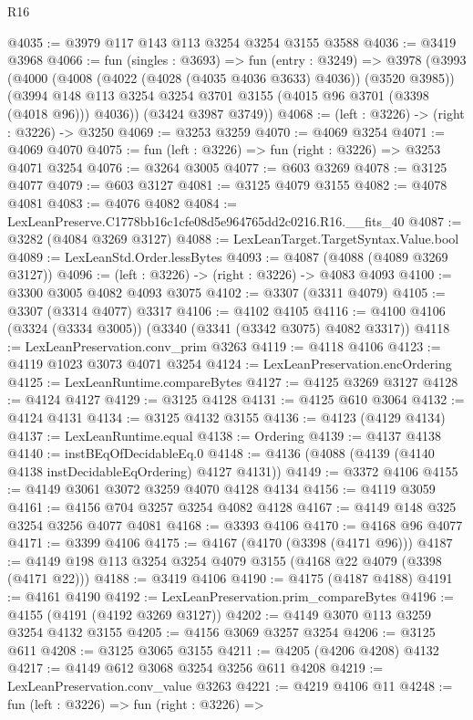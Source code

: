 \begin{lexlean}{R16}
\begin{coremodule}
@4035 := @3979 @117 @143 @113 @3254 @3254 @3155 @3588
@4036 := @3419 @3968
@4066 := fun (singles : @3693) =>
  fun (entry : @3249) =>
  @3978
    (@3993
      (@4000
        (@4008 (@4022 (@4028 (@4035 @4036 @3633) @4036)) (@3520 @3985))
        (@3994 @148 @113 @3254 @3254 @3701 @3155 (@4015 @96 @3701 (@3398 (@4018 @96))) @4036))
      (@3424 @3987 @3749))
@4068 := (left : @3226) -> (right : @3226) -> @3250
@4069 := @3253 @3259
@4070 := @4069 @3254
@4071 := @4069 @4070
@4075 := fun (left : @3226) => fun (right : @3226) => @3253 @4071 @3254
@4076 := @3264 @3005
@4077 := @603 @3269
@4078 := @3125 @4077
@4079 := @603 @3127
@4081 := @3125 @4079 @3155
@4082 := @4078 @4081
@4083 := @4076 @4082
@4084 := LexLeanPreserve.C1778bb16c1cfe08d5e964765dd2c0216.R16.__fits_40
@4087 := @3282 (@4084 @3269 @3127)
@4088 := LexLeanTarget.TargetSyntax.Value.bool
@4089 := LexLeanStd.Order.lessBytes
@4093 := @4087 (@4088 (@4089 @3269 @3127))
@4096 := (left : @3226) -> (right : @3226) -> @4083 @4093
@4100 := @3300 @3005 @4082 @4093 @3075
@4102 := @3307 (@3311 @4079)
@4105 := @3307 (@3314 @4077) @3317
@4106 := @4102 @4105
@4116 := @4100 @4106 (@3324 (@3334 @3005)) (@3340 (@3341 (@3342 @3075) @4082 @3317))
@4118 := LexLeanPreservation.conv_prim @3263
@4119 := @4118 @4106
@4123 := @4119 @1023 @3073 @4071 @3254
@4124 := LexLeanPreservation.encOrdering
@4125 := LexLeanRuntime.compareBytes
@4127 := @4125 @3269 @3127
@4128 := @4124 @4127
@4129 := @3125 @4128
@4131 := @4125 @610 @3064
@4132 := @4124 @4131
@4134 := @3125 @4132 @3155
@4136 := @4123 (@4129 @4134)
@4137 := LexLeanRuntime.equal
@4138 := Ordering
@4139 := @4137 @4138
@4140 := instBEqOfDecidableEq.{0}
@4148 := @4136 (@4088 (@4139 (@4140 @4138 instDecidableEqOrdering) @4127 @4131))
@4149 := @3372 @4106
@4155 := @4149 @3061 @3072 @3259 @4070 @4128 @4134
@4156 := @4119 @3059
@4161 := @4156 @704 @3257 @3254 @4082 @4128
@4167 := @4149 @148 @325 @3254 @3256 @4077 @4081
@4168 := @3393 @4106
@4170 := @4168 @96 @4077
@4171 := @3399 @4106
@4175 := @4167 (@4170 (@3398 (@4171 @96)))
@4187 := @4149 @198 @113 @3254 @3254 @4079 @3155 (@4168 @22 @4079 (@3398 (@4171 @22)))
@4188 := @3419 @4106
@4190 := @4175 (@4187 @4188)
@4191 := @4161 @4190
@4192 := LexLeanPreservation.prim_compareBytes
@4196 := @4155 (@4191 (@4192 @3269 @3127))
@4202 := @4149 @3070 @113 @3259 @3254 @4132 @3155
@4205 := @4156 @3069 @3257 @3254
@4206 := @3125 @611
@4208 := @3125 @3065 @3155
@4211 := @4205 (@4206 @4208) @4132
@4217 := @4149 @612 @3068 @3254 @3256 @611 @4208
@4219 := LexLeanPreservation.conv_value @3263
@4221 := @4219 @4106 @11
@4248 := fun (left : @3226) =>
  fun (right : @3226) =>

\end{coremodule}
\end{lexlean}
